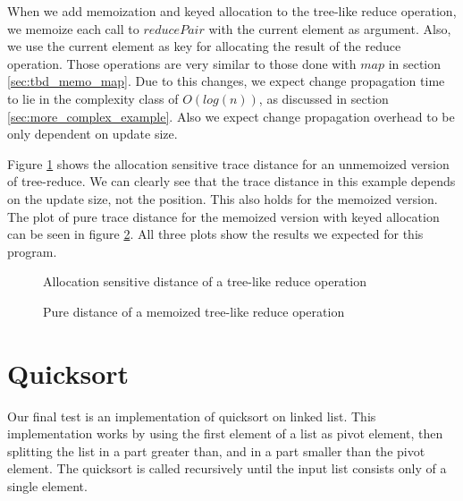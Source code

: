 When we add memoization and keyed allocation to the tree-like reduce operation, we memoize each call to $reducePair$ with the current element as argument. Also, we use the current element as key for allocating the result of the reduce operation. Those operations are very similar to those done with $map$ in section \ref{sec:tbd_memo_map}. Due to this changes, we expect change propagation time to lie in the complexity class of $O(log(n))$, as discussed in section \ref{sec:more_complex_example}. Also we expect change propagation overhead to be only dependent on update size. 

Figure \ref{plot:tree_reduce_alloc} shows the allocation sensitive trace distance for an unmemoized version of tree-reduce. We can clearly see that the trace distance in this example depends on the update size, not the position. This also holds for the memoized version. The plot of pure trace distance for the memoized version with keyed allocation can be seen in figure \ref{plot:memo_tree_reduce_pure}. All three plots show the results we expected for this program. 

\begin{figure}
\centering
{}
\caption{Allocation sensitive distance of a tree-like reduce operation}
\label{plot:tree_reduce_alloc}
\end{figure}



\begin{figure}
\centering
{}
\caption{Pure distance of a memoized tree-like reduce operation}
\label{plot:memo_tree_reduce_pure}
\end{figure}

\section{Quicksort}

Our final test is an implementation of quicksort on linked list. This implementation works by using the first element of a list as pivot element, then splitting the list in a part greater than, and in a part smaller than the pivot element. The quicksort is called recursively until the input list consists only of a single element. 


